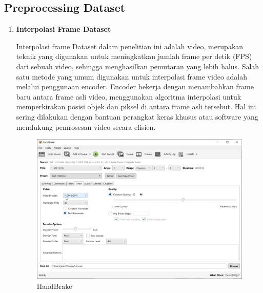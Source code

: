 \subsection{Preprocessing Dataset}
\label{subsec:Preprocessing}
\begin{enumerate}
  \item{\textbf{Interpolasi Frame Dataset}}
  
  Interpolasi frame Dataset dalam penelitian ini adalah video, merupakan teknik yang digunakan untuk meningkatkan jumlah frame per detik (FPS) dari sebuah video, sehingga menghasilkan pemutaran yang lebih halus. Salah satu metode yang umum digunakan untuk interpolasi frame video adalah melalui penggunaan encoder. Encoder bekerja dengan menambahkan frame baru antara frame asli video, menggunakan algoritma interpolasi untuk memperkirakan posisi objek dan piksel di antara frame asli tersebut. Hal ini sering dilakukan dengan bantuan perangkat keras khusus atau software yang mendukung pemrosesan video secara efisien.

  \begin{figure} [H] \centering
    \includegraphics[scale=0.2]{gambar/Handbrake.jpg}
    \caption{HandBrake}
    \label{fig:HandBrake}
  \end{figure}


\end{enumerate}
